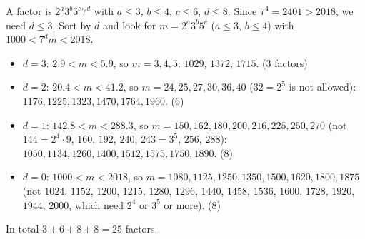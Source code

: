 A factor is $2^a3^b5^c7^d$ with $a\le3$, $b\le4$, $c\le6$, $d\le8$. Since $7^4=2401>2018$, we need $d\le3$. Sort by $d$ and look for $m=2^a3^b5^c$ ($a\le3$, $b\le4$) with $1000<7^dm<2018$.
\begin{itemize}
\item $d=3$: $2.9<m<5.9$, so $m=3,4,5$: $1029$, $1372$, $1715$. ($3$ factors)
\item $d=2$: $20.4<m<41.2$, so $m=24,25,27,30,36,40$ ($32=2^5$ is not allowed): $1176,1225,1323,1470,1764,1960$. ($6$)
\item $d=1$: $142.8<m<288.3$, so $m=150,162,180,200,216,225,250,270$ (not $144=2^4\cdot9$, $160$, $192$, $240$, $243=3^5$, $256$, $288$): $1050,1134,1260,1400,1512,1575,1750,1890$. ($8$)
\item $d=0$: $1000<m<2018$, so $m=1080,1125,1250,1350,1500,1620,1800,1875$ (not $1024$, $1152$, $1200$, $1215$, $1280$, $1296$, $1440$, $1458$, $1536$, $1600$, $1728$, $1920$, $1944$, $2000$, which need $2^4$ or $3^5$ or more). ($8$)
\end{itemize}
In total $3+6+8+8=\boxed{25}$ factors.

